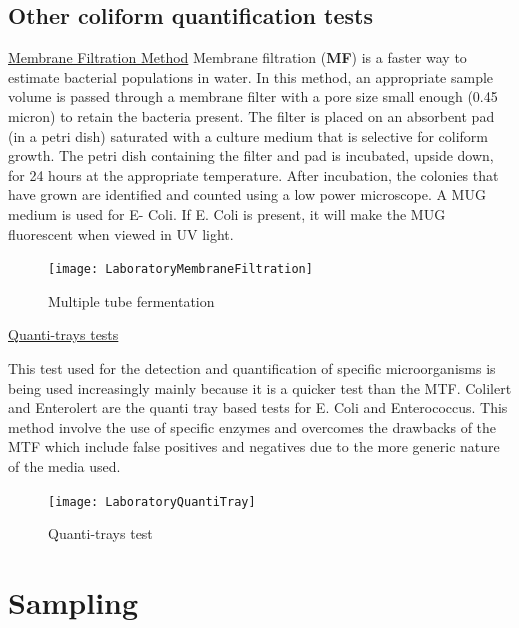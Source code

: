 \subsection{Other coliform quantification tests}
\ul{Membrane Filtration Method}
Membrane filtration (\textbf{MF}) is a faster way to estimate bacterial populations in water.  In this method, an appropriate sample volume is passed through a membrane filter with a pore size small enough (0.45 micron) to retain the bacteria present. The filter is placed on an absorbent pad (in a petri dish) saturated with a culture medium that is selective for coliform growth. The petri dish containing the filter and pad is incubated, upside down, for 24 hours at the appropriate temperature. After incubation, the colonies that have grown are identified and counted using a low power microscope. A MUG medium is used for E- Coli.  If E. Coli is present, it will make the MUG fluorescent when viewed in UV light. 


\begin{figure}[!htb]
    \centering
       \texttt{[image: LaboratoryMembraneFiltration]}
        \caption{Multiple tube fermentation}
    \end{figure}
    
\ul{Quanti-trays tests}

This test used for the detection and quantification of specific microorganisms is being used increasingly mainly because it is a quicker test than the MTF.  Colilert and Enterolert  are the quanti tray based tests for E. Coli and Enterococcus.  This method involve the use of specific enzymes and overcomes the drawbacks of the MTF which include false positives and negatives due to the more generic nature of the media used.
\begin{figure}[!htb]
    \centering
\texttt{[image: LaboratoryQuantiTray]}
\caption{Quanti-trays test}
\end{figure}

\section{Sampling}

